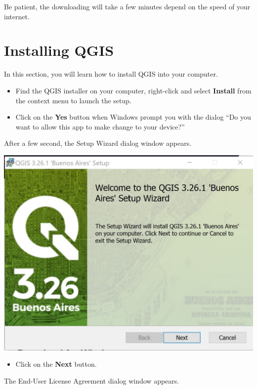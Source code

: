 \documentclass[
  letterpaper,
  DIV=11,
  numbers=noendperiod]{scrreprt}
\providecommand{\tightlist}{%
  \setlength{\itemsep}{0pt}\setlength{\parskip}{0pt}}\usepackage{longtable,booktabs,array}
\begin{document}
Be patient, the downloading will take a few minutes depend on the speed
of your internet.

\hypertarget{installing-qgis}{%
\section{Installing QGIS}\label{installing-qgis}}

In this section, you will learn how to install QGIS into your computer.

\begin{itemize}
\item
  Find the QGIS installer on your computer, right-click and select
  \textbf{Install} from the context menu to launch the setup.
\item
  Click on the \textbf{Yes} button when Windows prompt you with the
  dialog ``Do you want to allow this app to make change to your
  device?''
\end{itemize}

After a few second, the Setup Wizard dialog window appears.

\includegraphics{./img/image5.jpg}

\begin{itemize}
\tightlist
\item
  Click on the \textbf{Next} button.
\end{itemize}

The End-User License Agreement dialog window appears.
\end{document}
